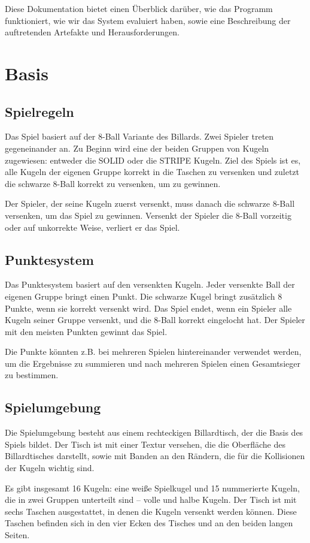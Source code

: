 \documentclass[a4paper,12pt]{article}
\begin{document}
	Diese Dokumentation bietet einen Überblick darüber, wie das Programm funktioniert, wie wir das System evaluiert haben, sowie eine Beschreibung der auftretenden Artefakte und Herausforderungen.
	
	\section{Basis}
	\subsection{Spielregeln}
	Das Spiel basiert auf der 8-Ball Variante des Billards. Zwei Spieler treten gegeneinander an. Zu Beginn wird eine der beiden Gruppen von Kugeln zugewiesen: entweder die SOLID oder die STRIPE Kugeln. Ziel des Spiels ist es, alle Kugeln der eigenen Gruppe korrekt in die Taschen zu versenken und zuletzt die schwarze 8-Ball korrekt zu versenken, um zu gewinnen.
	
	Der Spieler, der seine Kugeln zuerst versenkt, muss danach die schwarze 8-Ball versenken, um das Spiel zu gewinnen. Versenkt der Spieler die 8-Ball vorzeitig oder auf unkorrekte Weise, verliert er das Spiel.
	\subsection{Punktesystem}
	Das Punktesystem basiert auf den versenkten Kugeln. Jeder versenkte Ball der eigenen Gruppe bringt einen Punkt. Die schwarze Kugel bringt zusätzlich 8 Punkte, wenn sie korrekt versenkt wird. Das Spiel endet, wenn ein Spieler alle Kugeln seiner Gruppe versenkt, und die 8-Ball korrekt eingelocht hat. Der Spieler mit den meisten Punkten gewinnt das Spiel.
	
	Die Punkte könnten z.B. bei mehreren Spielen hintereinander verwendet werden, um die Ergebnisse zu summieren und nach mehreren Spielen einen Gesamtsieger zu bestimmen.
	\subsection{Spielumgebung}
	Die Spielumgebung besteht aus einem rechteckigen Billardtisch, der die Basis des Spiels bildet. Der Tisch ist mit einer Textur versehen, die die Oberfläche des Billardtisches darstellt, sowie mit Banden an den Rändern, die für die Kollisionen der Kugeln wichtig sind.
	
	Es gibt insgesamt 16 Kugeln: eine weiße Spielkugel und 15 nummerierte Kugeln, die in zwei Gruppen unterteilt sind – volle und halbe Kugeln. Der Tisch ist mit sechs Taschen ausgestattet, in denen die Kugeln versenkt werden können. Diese Taschen befinden sich in den vier Ecken des Tisches und an den beiden langen Seiten.
	
\end{document}
